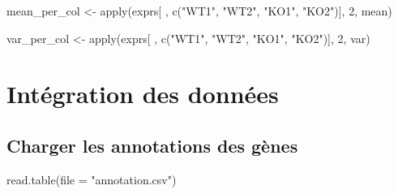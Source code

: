 \documentclass[
]{book}
\newenvironment{Shaded}{\begin{snugshade}}{\end{snugshade}}
\newcommand{\AttributeTok}[1]{\textcolor[rgb]{0.77,0.63,0.00}{#1}}
\newcommand{\DecValTok}[1]{\textcolor[rgb]{0.00,0.00,0.81}{#1}}
\newcommand{\FunctionTok}[1]{\textcolor[rgb]{0.00,0.00,0.00}{#1}}
\newcommand{\NormalTok}[1]{#1}
\newcommand{\OtherTok}[1]{\textcolor[rgb]{0.56,0.35,0.01}{#1}}
\newcommand{\StringTok}[1]{\textcolor[rgb]{0.31,0.60,0.02}{#1}}
\begin{document}
\begin{Shaded}
\begin{Highlighting}[]
\NormalTok{mean\_per\_col }\OtherTok{\textless{}{-}} \FunctionTok{apply}\NormalTok{(exprs[ , }\FunctionTok{c}\NormalTok{(}\StringTok{"WT1"}\NormalTok{, }\StringTok{"WT2"}\NormalTok{, }\StringTok{"KO1"}\NormalTok{, }\StringTok{"KO2"}\NormalTok{)], }\DecValTok{2}\NormalTok{, mean)}

\NormalTok{var\_per\_col }\OtherTok{\textless{}{-}} \FunctionTok{apply}\NormalTok{(exprs[ , }\FunctionTok{c}\NormalTok{(}\StringTok{"WT1"}\NormalTok{, }\StringTok{"WT2"}\NormalTok{, }\StringTok{"KO1"}\NormalTok{, }\StringTok{"KO2"}\NormalTok{)], }\DecValTok{2}\NormalTok{, var)}
\end{Highlighting}
\end{Shaded}

\hypertarget{intuxe9gration-des-donnuxe9es}{%
\chapter{Intégration des données}\label{intuxe9gration-des-donnuxe9es}}

\hypertarget{charger-les-annotations-des-guxe8nes}{%
\section{Charger les annotations des gènes}\label{charger-les-annotations-des-guxe8nes}}

\begin{Shaded}
\begin{Highlighting}[]
\FunctionTok{read.table}\NormalTok{(}\AttributeTok{file =} \StringTok{"annotation.csv"}\NormalTok{) }
\end{Highlighting}
\end{Shaded}
\end{document}
